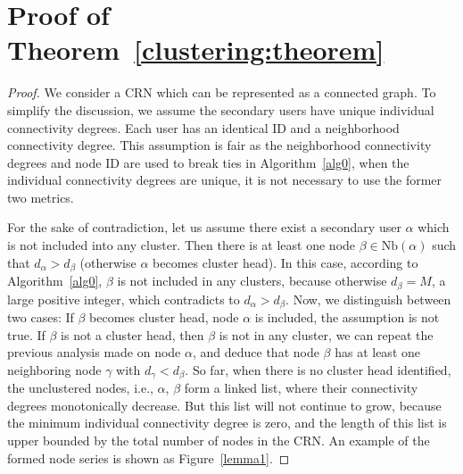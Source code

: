 \documentclass[times]{ettauth}
\newcommand{\ie}{i.e., }
\theoremstyle{mytheoremstyle}
\theoremstyle{mytheoremstyle}
\theoremstyle{mytheoremstyle}
\begin{document}
\section{Proof of Theorem~\ref{clustering:theorem}}
\begin{proof}
\label{proof_clustering:theorem}
We consider a CRN which can be represented as a connected graph.
To simplify the discussion, we assume the secondary users have unique individual connectivity degrees. 
Each user has an identical ID and a neighborhood connectivity degree.
This assumption is fair as the neighborhood connectivity degrees and node ID are used to break ties in Algorithm~\ref{alg0}, when the individual connectivity degrees are unique, it is not necessary to use the former two metrics. 

For the sake of contradiction, let us assume there exist a secondary user $\alpha$ which is not included into any cluster.
Then there is at least one node $\beta\in \text{Nb}(\alpha)$ such that $d_{\alpha} > d_{\beta}$ (otherwise $\alpha$ becomes cluster head). 
In this case, according to Algorithm~\ref{alg0}, $\beta$ is not included in any clusters, because otherwise $d_{\beta} = M$, a large positive integer, which contradicts to $d_{\alpha} > d_{\beta}$.
Now, we distinguish between two cases: 
If $\beta$ becomes cluster head, node $\alpha$ is included, the assumption is not true.
If $\beta$ is not a cluster head, then $\beta$ is not in any cluster, we can repeat the previous analysis made on node $\alpha$, and deduce that node $\beta$ has at least one neighboring node $\gamma$ with $d_{\gamma} < d_{\beta}$.
So far, when there is no cluster head identified, the unclustered nodes, \ie $\alpha$, $\beta$ form a linked list, where their connectivity degrees monotonically decrease.
But this list will not continue to grow, because the minimum individual connectivity degree is zero, and the length of this list is upper bounded by the total number of nodes in the CRN.
An example of the formed node series is shown as Figure~\ref{lemma1}.


\end{proof}
\end{document}
